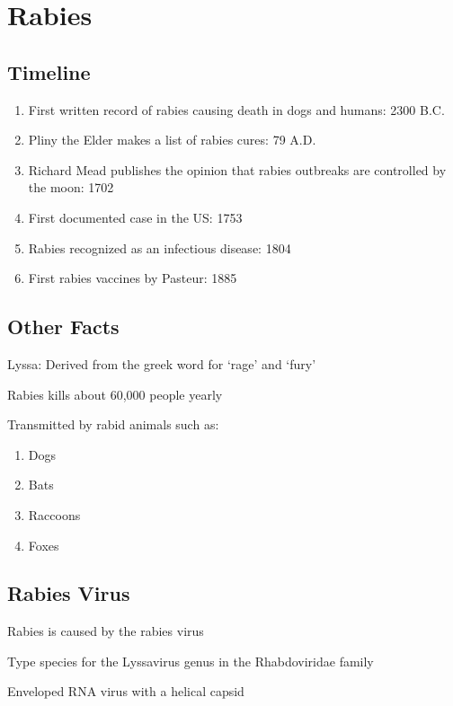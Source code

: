 \documentclass{notes}
\begin{document}
\section{Rabies}

\subsection{Timeline}

\begin{enumerate}
    \item First written record of rabies causing death in dogs and humans: 2300 B.C.
    \item Pliny the Elder makes a list of rabies cures: 79 A.D.
    \item Richard Mead publishes the opinion that rabies outbreaks are controlled by the moon: 1702
    \item First documented case in the US: 1753
    \item Rabies recognized as an infectious disease: 1804
    \item First rabies vaccines by Pasteur: 1885
\end{enumerate}

\subsection{Other Facts}

Lyssa: Derived from the greek word for `rage' and `fury'

Rabies kills about 60,000 people yearly

Transmitted by rabid animals such as:

\begin{enumerate}
    \item Dogs
    \item Bats
    \item Raccoons
    \item Foxes
\end{enumerate}

\subsection{Rabies Virus}

Rabies is caused by the rabies virus

\tab \indicates Type species for the Lyssavirus genus in the Rhabdoviridae family

\tab \indicates Enveloped RNA virus with a helical capsid
\end{document}
